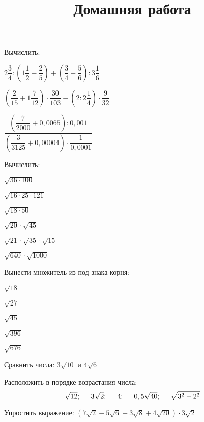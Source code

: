 \documentclass[12pt, a4paper]{article}
\begin{document}
	\title{Домашняя работа}
	\begin{enumcols}[label=\textbf{\arabic*.}]
		\item Вычислить:
		\begin{enumcols}[itemcolumns=2]
			\item \( 2\dfrac{3}{4}:\left( 1\dfrac{1}{2}-\dfrac{2}{5} \right)+\left( \dfrac{3}{4}+\dfrac{5}{6} \right):3\dfrac{1}{6} \)
			\item \( \left( \dfrac{2}{15}+1\dfrac{7}{12} \right)\cdot\dfrac{30}{103}-\left( 2:2\dfrac{1}{4} \right)\cdot\dfrac{9}{32} \)
			\item \( \dfrac{\left( \dfrac{7}{2000}+0,0065 \right):0,001}{\left( \dfrac{3}{3125}+0,00004 \right)\cdot\dfrac{1}{0,0001}} \)
		\end{enumcols}
		\item Вычислить:
		\begin{enumcols}[itemcolumns=4]
			\item \( \sqrt{36\cdot100} \)
			\item \( \sqrt{16\cdot25\cdot121} \)
			\item \( \sqrt{18\cdot50} \)
			\item \( \sqrt{20}\cdot\sqrt{45} \)
			\item \( \sqrt{21}\cdot\sqrt{35}\cdot\sqrt{15} \)
			\item \( \sqrt{640}\cdot\sqrt{1000} \)
		\end{enumcols}
		\item Вынести множитель из-под знака корня:
		\begin{enumcols}[itemcolumns=5]
			\item \( \sqrt{18} \)
			\item \( \sqrt{27} \)
			\item \( \sqrt{45} \)
			\item \( \sqrt{396} \)
			\item \( \sqrt{676} \)
		\end{enumcols}
		\item Сравнить числа: \( 3\sqrt{10} \) и \( 4\sqrt{6} \)
		\item Расположить в порядке возрастания числа:
		\[ \sqrt{12};\hspace{0.5cm}3\sqrt{2};\hspace{0.5cm}4;\hspace{0.5cm}0,5\sqrt{40};\hspace{0.5cm}\sqrt{3^2-2^2} \]
		\item Упростить выражение: \( (7\sqrt{2}-5\sqrt{6}-3\sqrt{8}+4\sqrt{20})\cdot3\sqrt{2} \)
	\end{enumcols}
\end{document}
